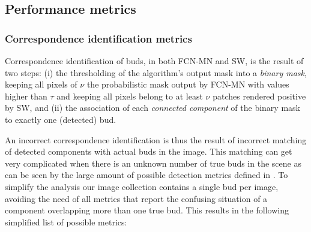 \documentclass[a4paper,authoryear,review]{elsarticle}
\begin{document}
\subsection{Performance metrics} \label{sec:metrics}





\subsubsection{Correspondence identification metrics } \label{subsec:detectmetrics}

Correspondence identification of buds, in both FCN-MN and SW, is the result of two steps: (i)  the thresholding of the algorithm’s output mask into a \emph{binary mask}, keeping all pixels of $\nu$ the probabilistic mask output by FCN-MN with values higher than $\tau$ and keeping all pixels belong to at least $\nu$ patches rendered positive by SW, and (ii) the association of each \emph{connected component} of the binary mask to exactly one (detected) bud. 

%
An incorrect correspondence identification is thus the result of incorrect matching of detected components with actual buds in the image. This matching can get very complicated when there is an unknown number of true buds in the scene as can be seen by the large amount of possible detection metrics defined in \cite{oguz2017dice}. To simplify the analysis our image collection contains a single bud per image, avoiding the need of all metrics that report the confusing situation of a component overlapping more than one true bud. This results in the following simplified list of possible metrics:
\end{document}
